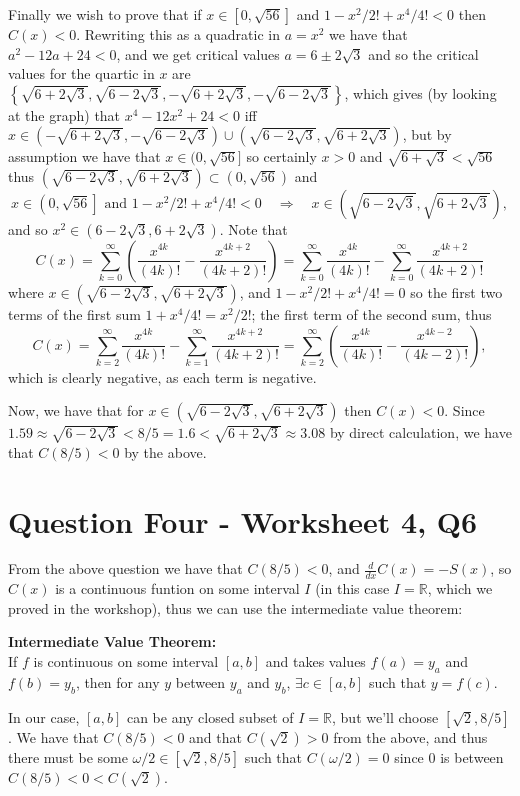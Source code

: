 \documentclass{article}
\def \R {\mathbb{R}}
\def \thm {\vspace{1ex} \par \begingroup \narrower \noindent}
\def \thmend {\par \endgroup \vspace{1ex}}
\begin{document}
Finally we wish to prove that if $x\in[0,\sqrt{56}]$ and $1-x^2/2! + x^4/4! < 0$ then $C(x) < 0$. Rewriting this as a quadratic in $a=x^2$ we have that $a^2 - 12a +24 <0$, and we get critical values $a=6\pm2\sqrt{3}$ and so the critical values for the quartic in $x$ are $\left\{\sqrt{6+2\sqrt{3}},\sqrt{6-2\sqrt{3}},-\sqrt{6+2\sqrt{3}},-\sqrt{6-2\sqrt{3}}\right\}$, which gives (by looking at the graph) that $x^4-12x^2+24<0$ iff $x\in(-\sqrt{6+2\sqrt{3}},-\sqrt{6-2\sqrt{3}})\cup(\sqrt{6-2\sqrt{3}},\sqrt{6+2\sqrt{3}})$, but by assumption we have that $x\in(0,\sqrt{56}]$ so certainly $x>0$ and $\sqrt{6+\sqrt{3}}<\sqrt{56}$ thus $(\sqrt{6-2\sqrt{3}},\sqrt{6+2\sqrt{3}})\subset(0,\sqrt{56})$ and
	\[
		x\in\left(0,\sqrt{56}\right]
		\text{  and  }
		1 - x^2/2! + x^4/4! < 0 
		\quad\Rightarrow\quad
		x\in\left(\sqrt{6-2\sqrt{3}},\sqrt{6+2\sqrt{3}}\right),
	\]
and so $x^2\in\left(6-2\sqrt{3},6+2\sqrt{3}\right)$. Note that 
	\begin{equation}\label{eqn:cos}
		C(x)=
		\sum_{k=0}^\infty 
			\left(
			\frac{x^{4k}}{(4k)!} - \frac{x^{4k+2}}{(4k+2)!}
			\right)
		=
		\sum_{k=0}^\infty   \frac{x^{4k}  }{(4k)!} 
		- \sum_{k=0}^\infty \frac{x^{4k+2}}{(4k+2)!}
	\end{equation}
where $x\in\left(\sqrt{6-2\sqrt{3}},\sqrt{6+2\sqrt{3}}\right)$, and $1-x^2/2!+x^4/4!=0$ so the first two terms of the first sum $1+x^4/4! = x^2/2!$; the first term of the second sum, thus
	\[
		C(x) = 
		\sum_{k=2}^\infty   \frac{x^{4k}  }{(4k)!} 
		- \sum_{k=1}^\infty \frac{x^{4k+2}}{(4k+2)!}
		=
		\sum_{k=2}^\infty \left( \frac{x^{4k}}{(4k)!} 
		- \frac{x^{4k-2}}{(4k-2)!} \right),
	\] 
which is clearly negative, as each term is negative.

Now, we have that for $x\in\left(\sqrt{6-2\sqrt{3}},\sqrt{6+2\sqrt{3}}\right)$ then $C(x)<0$. Since $1.59\approx\sqrt{6-2\sqrt{3}} < 8/5=1.6 < \sqrt{6+2\sqrt{3}}\approx3.08$ by direct calculation, we have that $C(8/5)<0$ by the above.



\newpage
\section*{Question Four - Worksheet 4, Q6}

From the above question we have that $C(8/5)<0$, and $\frac{d}{dx}C(x) = -S(x)$, so $C(x)$ is a continuous funtion on some interval $I$ (in this case $I=\R$, which we proved in the workshop), thus we can use the intermediate value theorem:
	\thm\textbf{Intermediate Value Theorem:}\\
	If $f$ is continuous on some interval $[a,b]$ and takes values $f(a)=y_a$ and $f(b)=y_b$, then for any $y$ between $y_a$ and $y_b$, $\exists c\in[a,b]$ such that $y=f(c)$.
	\thmend
\noindent In our case, $[a,b]$ can be any closed subset of $I=\R$, but we'll choose $[\sqrt{2},8/5]$. We have that $C(8/5)<0$ and that $C(\sqrt{2})>0$ from the above, and thus there must be some $\omega/2\in[\sqrt{2},8/5]$ such that $C(\omega/2) = 0$ since $0$ is between $C(8/5)<0<C(\sqrt{2})$.
\end{document}
